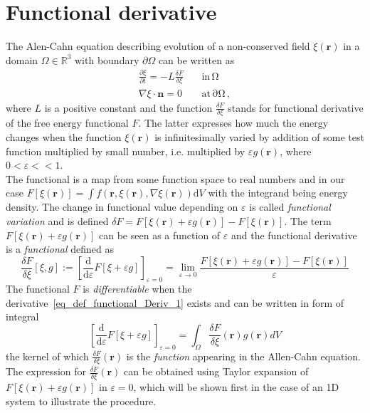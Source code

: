 \chapter{Functional derivative} \label{ch_appendix_functional_derivative}
The Alen-Cahn equation describing evolution of a non-conserved field $\xi(\mathbf{r})$ in a domain $\Omega\in\mathbb{R}^3$ with boundary $\partial\Omega$ can be written as
\begin{align}
	\frac{\partial \xi}{\partial t} = -L\frac{\delta F}{\delta \xi} \quad &\mathrm{in \,\Omega}\\
	\nabla\xi\cdot\bm{n} = 0 \quad &\mathrm{at \, \partial\Omega}\,,
\end{align}
where $L$ is a positive constant and the function $\frac{\delta F}{\delta \xi}$ stands for functional derivative of the free energy functional $F$. The latter expresses how much the energy changes when the function $\xi(\mathbf{r})$ is infinitesimally varied by addition of some test function multiplied by small number, i.e. multiplied by $\varepsilon g(\mathbf{r})$, where $0<\varepsilon<<1$.\\
The functional is a map from some function space to real numbers and in our case $ F[\xi(\bm{r})] = \int f(\bm{r}, \xi(\bm{r}),\nabla\xi(\bm{r}))\mathrm{d}V $ with the integrand being energy density. The change in functional value depending on $\varepsilon$ is called \textit{functional variation} and is defined $\delta F = F[\xi(\mathbf{r})+\varepsilon g(\mathbf{r})]-F[\xi(\mathbf{r})]$. The term $F[\xi(\mathbf{r})+\varepsilon g(\mathbf{r})]$ can be seen as a function of $\varepsilon$ and the functional derivative is a \textit{functional} defined as 
\begin{equation} \label{eq_def_functional_Deriv_1}
	\frac{\delta F}{\delta \xi}[\xi,g] := \left[ \dfrac{\mathrm{d}}{\mathrm{d}\varepsilon}F[\xi + \varepsilon g] \right]_{\varepsilon=0} = \lim_{\varepsilon\rightarrow0} \frac{F[\xi(\mathbf{r})+\varepsilon g(\mathbf{r})] - F[\xi(\mathbf{r})]}{\varepsilon}  
\end{equation}
The functional $F$ is \textit{differentiable} when the derivative~\ref{eq_def_functional_Deriv_1} exists and can be written in form of integral
\begin{equation}\label{eq_def_functional_Deriv_2}
	\left[ \dfrac{\mathrm{d}}{\mathrm{d}\varepsilon}F[\xi + \varepsilon g] \right]_{\varepsilon=0} = \int_\Omega \frac{\delta F}{\delta \xi}(\mathbf{r})g(\mathbf{r})dV
\end{equation}
the kernel of which $\frac{\delta F}{\delta \xi}(\mathbf{r})$ is the \textit{function} appearing in the Allen-Cahn equation. The expression for $\frac{\delta F}{\delta \xi}(\mathbf{r})$ can be obtained using Taylor expansion of $F[\xi(\mathbf{r})+\varepsilon g(\mathbf{r})]$ in $\varepsilon=0$, which will be shown first in the case of an 1D system to illustrate the procedure. \\
